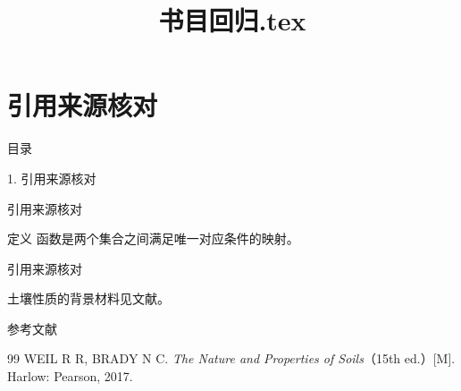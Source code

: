 \documentclass[aspectratio=169,10pt,fontset=fandol]{ctexbeamer}
\title{书目回归.tex}
\begin{document}
\section{引用来源核对}
\begin{frame}[t,fragile]{目录}
\normalsize
{\color{blue}\normalsize 1. 引用来源核对\par}\vspace{0.22em}
\end{frame}
\begin{frame}[t,fragile]{引用来源核对}
\normalsize
\begin{block}{定义}
{\normalsize
函数是两个集合之间满足唯一对应条件的映射。
}
\end{block}
\end{frame}
\begin{frame}[t,fragile]{引用来源核对}
\normalsize
{\normalsize

土壤性质的背景材料见文献\cite{BradyWeil}。


}
\end{frame}
\begin{frame}[t,fragile]{参考文献}
\normalsize
{\normalsize
\begin{thebibliography}{99}
 WEIL R R, BRADY N C. \emph{The Nature and Properties of Soils}（15th ed.）[M]. Harlow: Pearson, 2017.

\end{thebibliography}
}
\end{frame}
\end{document}
